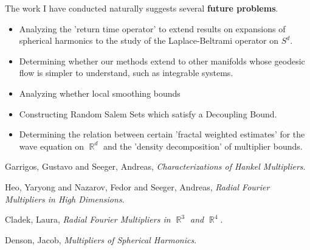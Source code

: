 \documentclass[12pt]{article}
\DeclareMathOperator{\RR}{\mathbb{R}}
\begin{document}
The work I have conducted naturally suggests several {\bf future problems}.
%
\begin{itemize}
	\item Analyzing the 'return time operator' to extend results on expansions of spherical harmonics to the study of the Laplace-Beltrami operator on $S^d$.

	\item Determining whether our methods extend to other manifolds whose geodesic flow is simpler to understand, such as integrable systems.

	\item Analyzing whether local smoothing bounds

	\item Constructing Random Salem Sets which satisfy a Decoupling Bound.

	\item Determining the relation between certain 'fractal weighted estimates' for the wave equation on $\RR^d$ and the 'density decomposition' of multiplier bounds.
\end{itemize}

\begin{thebibliography}{03}

 Garrigos, Gustavo and Seeger, Andreas,
	\emph{Characterizations of {H}ankel Multipliers}.

 Heo, Yaryong and Nazarov, Fedor and Seeger, Andreas,
	\emph{Radial {F}ourier Multipliers in High Dimensions}.

 Cladek, Laura,
	\emph{Radial {F}ourier Multipliers in $\RR^3$ and $\RR^4$}.

 Denson, Jacob,
	\emph{Multipliers of Spherical Harmonics}.


\end{thebibliography}
\end{document}
